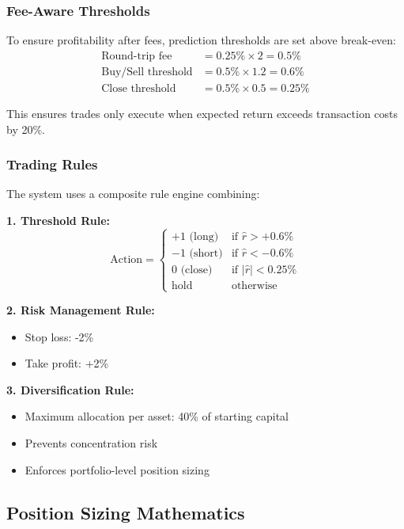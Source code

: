 \documentclass[12pt,a4paper]{article}
\begin{document}
\subsubsection{Fee-Aware Thresholds}
To ensure profitability after fees, prediction thresholds are set above break-even:
\begin{align}
    \text{Round-trip fee} &= 0.25\% \times 2 = 0.5\% \\
    \text{Buy/Sell threshold} &= 0.5\% \times 1.2 = 0.6\% \\
    \text{Close threshold} &= 0.5\% \times 0.5 = 0.25\%
\end{align}

This ensures trades only execute when expected return exceeds transaction costs by 20\%.

\subsubsection{Trading Rules}
The system uses a composite rule engine combining:

\textbf{1. Threshold Rule:}
\begin{equation}
    \text{Action} = \begin{cases}
        +1 \text{ (long)} & \text{if } \hat{r} > +0.6\% \\
        -1 \text{ (short)} & \text{if } \hat{r} < -0.6\% \\
        0 \text{ (close)} & \text{if } |\hat{r}| < 0.25\% \\
        \text{hold} & \text{otherwise}
    \end{cases}
\end{equation}

\textbf{2. Risk Management Rule:}
\begin{itemize}
    \item Stop loss: -2\%
    \item Take profit: +2\%
\end{itemize}

\textbf{3. Diversification Rule:}
\begin{itemize}
    \item Maximum allocation per asset: 40\% of starting capital
    \item Prevents concentration risk
    \item Enforces portfolio-level position sizing
\end{itemize}

\subsection{Position Sizing Mathematics}
\end{document}
